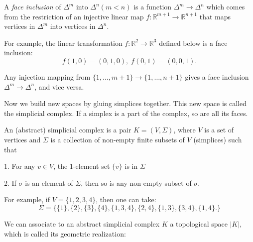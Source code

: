 \begin{definition} A \emph{face inclusion} of \({\Delta }^{m}\) into \({\Delta }^{n}\left( {m < n}\right)\) is a function \({\Delta }^{m} \rightarrow  {\Delta }^{n}\) which comes from the restriction of an injective linear map \(f: {\mathbb{R}}^{m + 1} \rightarrow  {\mathbb{R}}^{n + 1}\) that maps vertices in \({\Delta }^{m}\) into vertices in \({\Delta }^{n}\).
\end{definition}

For example, the linear transformation \(f: {\mathbb{R}}^{2} \rightarrow  {\mathbb{R}}^{3}\) defined below is a face inclusion:
\[
f\left( {1,0}\right)  = \left( {0,1,0}\right),\;f\left( {0,1}\right)  = \left( {0,0,1}\right).
\]

\begin{remark} Any injection mapping from \(\{ 1,\ldots,m + 1\}  \rightarrow  \{ 1,\ldots,n + 1\}\) gives a face inclusion \({\Delta }^{m} \rightarrow  {\Delta }^{n}\), and vice versa.
\end{remark}

Now we build new spaces by gluing simplices together. This new space is called the simplicial complex. If a simplex is a part of the complex, so are all its faces.
\begin{definition} \label{def:simplicial_complex} An (abstract) simplicial complex is a pair \(K = \left( {V,\Sigma }\right)\), where \(V\) is a set of vertices and \(\Sigma\) is a collection of non-empty finite subsets of \(V\) (simplices) such that

1. For any \(v \in  V\), the 1-element set \(\{ v\}\) is in \(\Sigma\)

2. If \(\sigma\) is an element of \(\Sigma\), then so is any non-empty subset of \(\sigma\).
\end{definition}

For example, if \(V = \{ 1,2,3,4\}\), then one can take:
\begin{equation} \label{eq:sigma}
\Sigma  = \{ \{ 1\},\{ 2\},\{ 3\},\{ 4\},\{ 1,3,4\},\{ 2,4\},\{ 1,3\},\{ 3,4\},\{ 1,4\}. \}    
\end{equation}

We can associate to an abstract simplicial complex \(K\) a topological space \(\left| K\right|\), which is called its geometric realization:

